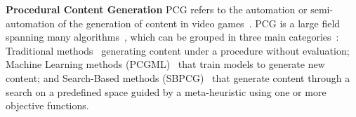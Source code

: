 \noindent \textbf{Procedural Content Generation}
PCG refers to the automation or semi-automation of the generation of content in video games~\cite{hendrikx2013procedural}. %
PCG is a large field spanning many algorithms~\cite{yannakakis2018artificial}, which can be grouped in three main categories~\cite{Barriga2019}: Traditional methods~\cite{freiknecht2017survey} generating content under a procedure without evaluation; Machine Learning methods (PCGML)~\cite{Summerville2018,liu2021deep,souchleris2023reinforcement} that train models to generate new content; and Search-Based methods (SBPCG)~\cite{hendrikx2013procedural,togelius2011search} that generate content through a search on a predefined space guided by a meta-heuristic using one or more objective functions. 
